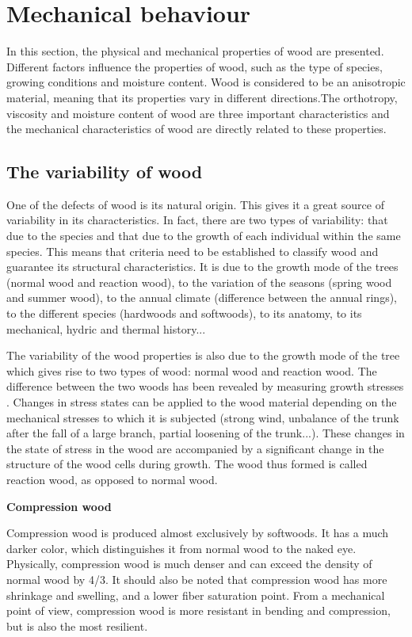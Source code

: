 \section{Mechanical behaviour}

In this section, the physical and mechanical properties of wood are presented. Different factors influence the properties of wood, such as the type of species, growing conditions and moisture content. Wood is considered to be an anisotropic material, meaning that its properties vary in different directions.The orthotropy, viscosity and moisture content of wood are three important characteristics and the mechanical characteristics of wood are directly related to these properties.

\subsection{The variability of wood}

One of the defects of wood is its natural origin. This gives it a great source of variability in its characteristics. In fact, there are two types of variability: that due to the species and that due to the growth of each individual within the same species. This means that criteria need to be established to classify wood and guarantee its structural characteristics. It is due to the growth mode of the trees (normal wood and reaction wood), to the variation of the seasons (spring wood and summer wood), to the annual climate (difference between the annual rings), to the different species (hardwoods and softwoods), to its anatomy, to its mechanical, hydric and thermal history...

The variability of the wood properties is also due to the growth mode of the tree which gives rise to two types of wood: normal wood and reaction wood. The difference between the two woods has been revealed by measuring growth stresses \cite{BrunoClair2003-2004}. Changes in stress states can be applied to the wood material depending on the mechanical stresses to which it is subjected (strong wind, unbalance of the trunk after the fall of a large branch, partial loosening of the trunk...). These changes in the state of stress in the wood are accompanied by a significant change in the structure of the wood cells during growth. The wood thus formed is called reaction wood, as opposed to normal wood.

\smallskip

\textbf{Compression wood}

Compression wood is produced almost exclusively by softwoods. It has a much darker color, which distinguishes it from normal wood to the naked eye. Physically, compression wood is much denser and can exceed the density of normal wood by 4/3. It should also be noted that compression wood has more shrinkage and swelling, and a lower fiber saturation point. From a mechanical point of view, compression wood is more resistant in bending and compression, but is also the most resilient.


